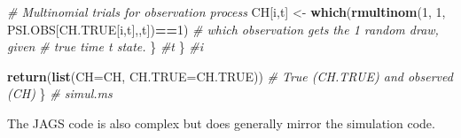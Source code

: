 \documentclass[
]{krantz}
\makeatletter
\newenvironment{Shaded}{\begin{snugshade}}{\end{snugshade}}
\newcommand{\AttributeTok}[1]{\textcolor[rgb]{0.27,0.27,0.27}{#1}}
\newcommand{\CommentTok}[1]{\textcolor[rgb]{0.37,0.37,0.37}{\textit{#1}}}
\newcommand{\DecValTok}[1]{\textcolor[rgb]{0.06,0.06,0.06}{#1}}
\newcommand{\FunctionTok}[1]{\textcolor[rgb]{0.27,0.27,0.27}{\textbf{#1}}}
\newcommand{\NormalTok}[1]{#1}
\newcommand{\OtherTok}[1]{\textcolor[rgb]{0.37,0.37,0.37}{#1}}
\newcommand{\SpecialCharTok}[1]{\textcolor[rgb]{0.43,0.43,0.43}{\textbf{#1}}}
\newenvironment{kframe}{%
\medskip{}
\setlength{\fboxsep}{.8em}
 \def\at@end@of@kframe{}%
 \ifinner\ifhmode%
  \def\at@end@of@kframe{\end{minipage}}%
  \begin{minipage}{\columnwidth}%
 \fi\fi%
 \def\FrameCommand##1{\hskip\@totalleftmargin \hskip-\fboxsep
 \colorbox{shadecolor}{##1}\hskip-\fboxsep
     \hskip-\linewidth \hskip-\@totalleftmargin \hskip\columnwidth}%
 \MakeFramed {\advance\hsize-\width
   \@totalleftmargin\z@ \linewidth\hsize
   \@setminipage}}%
 {\par\unskip\endMakeFramed%
 \at@end@of@kframe}
\renewenvironment{Shaded}{\begin{kframe}}{\end{kframe}}
\makeatother
\begin{document}
\begin{Shaded}
\begin{Highlighting}[]
         \CommentTok{\# Multinomial trials for observation process}
\NormalTok{         CH[i,t] }\OtherTok{\textless{}{-}} \FunctionTok{which}\NormalTok{(}\FunctionTok{rmultinom}\NormalTok{(}\DecValTok{1}\NormalTok{, }\DecValTok{1}\NormalTok{, PSI.OBS[CH.TRUE[i,t],,t])}\SpecialCharTok{==}\DecValTok{1}\NormalTok{)}
         \CommentTok{\# which observation gets the 1 random draw, given }
         \CommentTok{\# true time t state.}
\NormalTok{         \} }\CommentTok{\#t}
\NormalTok{      \} }\CommentTok{\#i}

    \FunctionTok{return}\NormalTok{(}\FunctionTok{list}\NormalTok{(}\AttributeTok{CH=}\NormalTok{CH, }\AttributeTok{CH.TRUE=}\NormalTok{CH.TRUE)) }
      \CommentTok{\# True (CH.TRUE) and observed (CH)}
\NormalTok{   \} }\CommentTok{\# simul.ms}
\end{Highlighting}
\end{Shaded}

The JAGS code is also complex but does generally mirror the simulation code.
\end{document}
